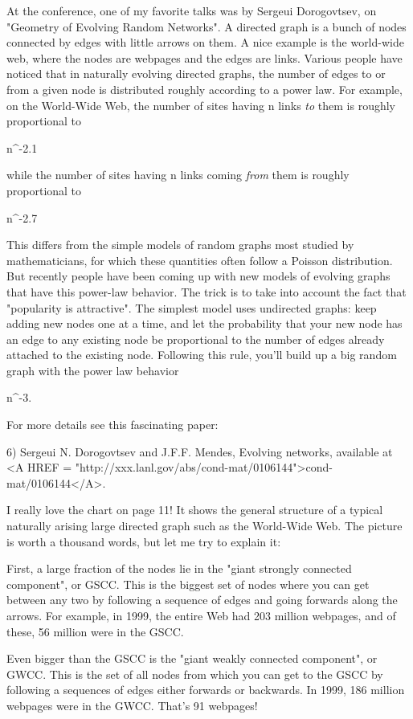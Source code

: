 At the conference, one of my favorite talks was by Sergeui Dorogovtsev,
on "Geometry of Evolving Random Networks".  A directed graph
is a bunch of nodes connected by edges with little arrows on them.  A
nice example is the world-wide web, where the nodes are webpages and the
edges are links.  Various people have noticed that in naturally evolving
directed graphs, the number of edges to or from a given node is
distributed roughly according to a power law.  For example, on the
World-Wide Web, the number of sites having n links \emph{to} them is
roughly proportional to

n^{-2.1}

while the number of sites having n links coming \emph{from} them is roughly 
proportional to 

n^{-2.7}

This differs from the simple models of random graphs most studied by
mathematicians, for which these quantities often follow a Poisson
distribution.  But recently people have been coming up with new models
of evolving graphs that have this power-law behavior.  The trick is to
take into account the fact that "popularity is attractive".  The
simplest model uses undirected graphs: keep adding new nodes one at a
time, and let the probability that your new node has an edge to any
existing node be proportional to the number of edges already attached to
the existing node.  Following this rule, you'll build up a big random
graph with the power law behavior

n^{-3}.

For more details see this fascinating paper:

6) Sergeui N. Dorogovtsev and J.F.F. Mendes, Evolving networks,
available at 
<A HREF = "http://xxx.lanl.gov/abs/cond-mat/0106144">cond-mat/0106144</A>.

I really love the chart on page 11!  It shows the general structure of a
typical naturally arising large directed graph such as the World-Wide Web.
The picture is worth a thousand words, but let me try to explain it:

First, a large fraction of the nodes lie in the "giant strongly
connected component", or GSCC.  This is the biggest set of nodes where
you can get between any two by following a sequence of edges and going
forwards along the arrows.  For example, in 1999, the entire Web had 203
million webpages, and of these, 56 million were in the GSCC.

Even bigger than the GSCC is the "giant weakly connected component", 
or
GWCC.  This is the set of all nodes from which you can get to the GSCC
by following a sequences of edges either forwards or backwards.  
In 1999, 186 million webpages were in the GWCC.  That's 91%
webpages!


